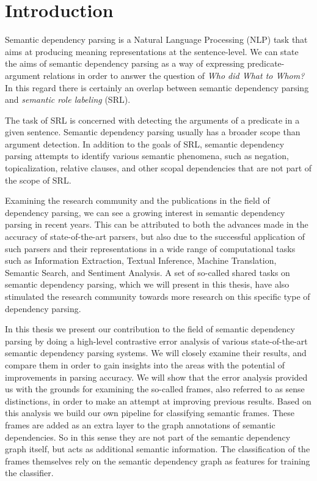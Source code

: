 \chapter{Introduction}
\label{chap:introduction}


Semantic dependency parsing is a Natural Language Processing (NLP) task that aims at producing meaning representations at the sentence-level. We can state the aims of semantic dependency parsing as a way of expressing predicate-argument relations in order to answer the question of \textit{Who did What to Whom?} In this regard there is certainly an overlap between semantic dependency parsing  and \textit{semantic role labeling} (SRL). 

The task of SRL is concerned with detecting the arguments of a predicate in a given sentence. Semantic dependency parsing usually has a broader scope than argument detection. In addition to the goals of SRL, semantic dependency parsing attempts to identify various semantic phenomena, such as negation, topicalization, relative clauses, and other scopal dependencies that are not part of the scope of SRL.

Examining the research community and the publications in the field of dependency parsing, we can see a growing interest in semantic dependency parsing in recent years. This can be attributed to both the advances made in the accuracy of state-of-the-art parsers, but also due to the successful application of such parsers and their representations in a wide range of computational tasks such as Information Extraction, Textual Inference, Machine Translation, Semantic Search, and Sentiment Analysis. A set of so-called shared tasks on semantic dependency parsing, which we will present in this thesis, have also stimulated the research community towards more research on this specific type of dependency parsing.

In this thesis we present our contribution to the field of semantic dependency parsing by doing a high-level contrastive error analysis of various state-of-the-art semantic dependency parsing systems. We will closely examine their results, and compare them in order to gain insights into the areas with the potential of improvements in parsing accuracy. We will show that the error analysis provided us with the grounds for examining the so-called frames, also referred to as sense distinctions, in order to make an attempt at improving previous results. Based on this analysis we build our own pipeline for classifying semantic frames. These frames are added as an extra layer to the graph annotations of semantic dependencies. So in this sense they are not part of the semantic dependency graph itself, but acts as additional semantic information. The classification of the frames themselves rely on the semantic dependency graph as features for training the classifier.

